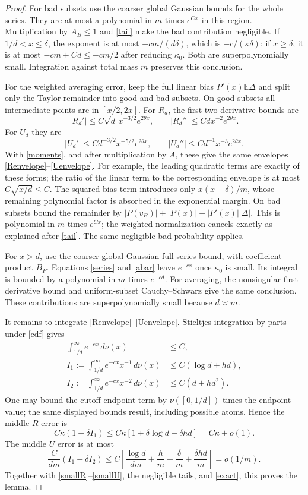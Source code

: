 \documentclass[11pt]{article}
\newcommand{\E}{\mathbb E}
\begin{document}
\begin{proof}
For bad subsets use the coarser global Gaussian bounds for the whole
series. They are at most a polynomial in $m$ times $e^{Cx}$ in this
region. Multiplication by $A_B\le1$ and \eqref{tail} make the bad
contribution negligible. If $1/d<x\le\delta$, the exponent is at most
$-cm/(d\delta)$, which is $-c/(\kappa\delta)$; if $x\ge\delta$,
it is at most $-cm+Cd\le-cm/2$ after reducing $\kappa_0$.
Both are superpolynomially small. Integration against total mass $m$
preserves this conclusion.

For the weighted averaging error, keep the full linear bias
$P'(x)\E\Delta$ and split only the Taylor remainder into good and bad
subsets. On good subsets all intermediate points are in $[x/2,2x]$.
For $R_d$, the first two derivative bounds are
\[
 |R_d'|\le C\sqrt d\,x^{-3/2}e^{2\theta x},\qquad
 |R_d''|\le C d x^{-2}e^{2\theta x}.
\]
For $U_d$ they are
\[
 |U_d'|\le C d^{-3/2}x^{-5/2}e^{2\theta x},\qquad
 |U_d''|\le C d^{-1}x^{-3}e^{2\theta x}.
\]
With \eqref{moments}, and after multiplication by $\bar A$, these
give the same envelopes \eqref{Renvelope}--\eqref{Uenvelope}.
For example, the leading quadratic terms are exactly of these forms;
the ratio of the linear term to the corresponding envelope is at
most $C\sqrt{x/d}\le C$. The squared-bias term introduces only
$x(x+\delta)/m$, whose remaining polynomial factor is absorbed in
the exponential margin. On bad subsets bound the remainder by
$|P(v_B)|+|P(x)|+|P'(x)||\Delta|$. This is polynomial in $m$ times
$e^{Cx}$; the weighted normalization cancels exactly as explained
after \eqref{tail}. The same negligible bad probability applies.

For $x>d$, use the coarser global Gaussian full-series bound, with
coefficient product $B_P$. Equations \eqref{series} and \eqref{abar}
leave $e^{-cx}$ once $\kappa_0$ is small. Its integral is bounded by
a polynomial in $m$ times $e^{-cd}$. For averaging, the nonsingular
first derivative bound and uniform-subset Cauchy--Schwarz give the
same conclusion. These contributions are superpolynomially small
because $d\asymp m$.

It remains to integrate \eqref{Renvelope}--\eqref{Uenvelope}.
Stieltjes integration by parts under \eqref{cdf} gives
\begin{align*}
 \int_{1/d}^\infty e^{-cx}\,d\nu(x)&\le C,\\
 I_1:=\int_{1/d}^\infty e^{-cx}x^{-1}\,d\nu(x)
       &\le C(\log d+hd),\\
 I_2:=\int_{1/d}^\infty e^{-cx}x^{-2}\,d\nu(x)
       &\le C(d+hd^2).
\end{align*}
One may bound the cutoff endpoint term by
$\nu([0,1/d])$ times the endpoint value; the same displayed bounds
result, including possible atoms. Hence the middle $R$ error is
\[
 C\kappa(1+\delta I_1)
 \le C\kappa[1+\delta\log d+\delta hd]=C\kappa+o(1).
\]
The middle $U$ error is at most
\[
 \frac C{dm}(I_1+\delta I_2)
 \le C\left[\frac{\log d}{dm}+\frac hm+\frac\delta m
                         +\frac{\delta hd}m\right]=o(1/m).
\]
Together with \eqref{smallR}--\eqref{smallU}, the negligible tails,
and \eqref{exact}, this proves the lemma.
\end{proof}
\end{document}

